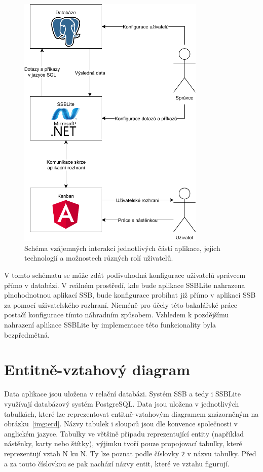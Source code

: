 \begin{figure}[H]
    \label{img:scheme}
	\centering
	\includegraphics[width=0.8\textwidth]{obrazky-figures/app-scheme.pdf}
	\caption{Schéma vzájemných interakcí jednotlivých částí aplikace, jejich technologií a možnostech různých rolí uživatelů.}
\end{figure}

V tomto schématu se může zdát podivuhodná konfigurace uživatelů správcem přímo v databázi. V reálném prostředí, kde bude aplikace SSBLite nahrazena plnohodnotnou aplikací SSB, bude konfigurace probíhat již přímo v aplikaci SSB za pomocí uživatelského rozhraní. Nicméně pro účely této bakalářské práce postačí konfigurace tímto náhradním způsobem. Vzhledem k pozdějšímu nahrazení aplikace SSBLite by implementace této funkcionality byla bezpředmětná.

\section{Entitně-vztahový diagram}\label{sec:erd}
Data aplikace jsou uložena v relační databázi. Systém SSB a tedy i SSBLite využívají databázový systém PostgreSQL. Data jsou uložena v jednotlivých tabulkách, které lze reprezentovat entitně-vztahovým diagramem znázorněným na obrázku~\ref{img:erd}. Názvy tabulek i sloupců jsou dle konvence společnosti v anglickém jazyce. Tabulky ve většině případu reprezentující entity (například nástěnky, karty nebo štítky), výjimku tvoří pouze propojovací tabulky, které reprezentují vztah N ku N. Ty lze poznat podle číslovky \texttt{2} v názvu tabulky. Před a za touto číslovkou se pak nachází názvy entit, které ve vztahu figurují.


